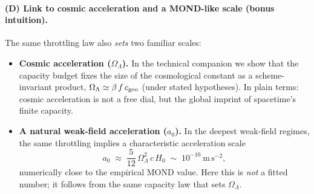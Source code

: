 \documentclass[aps,prd,onecolumn,superscriptaddress,nofootinbib]{revtex4-2}
\newcommand{\OmL}{\Omega_\Lambda}
\newcommand{\cgeo}{c_{\rm geo}}
\begin{document}
\medskip
\paragraph*{(D) Link to cosmic acceleration and a MOND-like scale (bonus intuition).}
The same throttling law also \emph{sets} two familiar scales:
\begin{itemize}
\item \textbf{Cosmic acceleration (\(\OmL\)).} In the technical companion we show that the capacity budget fixes the size of the cosmological constant as a scheme-invariant product, $\OmL \simeq \beta\,f\,\cgeo$ (under stated hypotheses). In plain terms: cosmic acceleration is not a free dial, but the global imprint of spacetime’s finite capacity.
\item \textbf{A natural weak-field acceleration (\(a_0\)).} In the deepest weak-field regimes, the same throttling implies a characteristic acceleration scale
\[
a_0 \;\approx\; \frac{5}{12}\,\OmL^2\,c\,H_0 \;\sim\; 10^{-10}\ \mathrm{m\,s^{-2}},
\]
numerically close to the empirical MOND value. Here this is \emph{not} a fitted number; it follows from the same capacity law that sets $\OmL$.
\end{itemize}

\medskip
\end{document}
